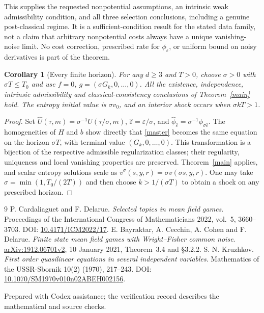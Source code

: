 \documentclass[11pt]{article}
\newtheorem{corollary}{Corollary}
\begin{document}
This supplies the requested nonpotential assumptions, an intrinsic weak admissibility condition, and all three selection conclusions, including a genuine post-classical regime. It is a sufficient-condition result for the stated data family, not a claim that arbitrary nonpotential costs always have a unique vanishing-noise limit. No cost correction, prescribed rate for $\phi_\varepsilon$, or uniform bound on noisy derivatives is part of the theorem.

\begin{corollary}[Every finite horizon]\label{allhorizons}
For any $d\ge3$ and $T>0$, choose $\sigma>0$ with $\sigma T\le T_0$ and use $f=0$, $g=(\sigma G_k,0,\ldots,0)$. All the existence, independence, intrinsic admissibility and classical-consistency conclusions of Theorem~\ref{main} hold. The entropy initial value is $\sigma v_0$, and an interior shock occurs when $\sigma kT>1$.
\end{corollary}
\begin{proof}
Set $\widehat U(\tau,m)=\sigma^{-1}U(\tau/\sigma,m)$, $\widehat\varepsilon=\varepsilon/\sigma$, and
$\widehat\phi_{\widehat\varepsilon}=\sigma^{-1}\phi_{\sigma\widehat\varepsilon}$. The homogeneities of $H$ and $b$ show directly that \eqref{master} becomes the same equation on the horizon $\sigma T$, with terminal value $(G_k,0,\ldots,0)$. This transformation is a bijection of the respective admissible regularization classes; their regularity, uniqueness and local vanishing properties are preserved. Theorem~\ref{main} applies, and scalar entropy solutions scale as $v^\sigma(s,y,r)=\sigma v(\sigma s,y,r)$. One may take $\sigma=\min(1,T_0/(2T))$ and then choose $k>1/(\sigma T)$ to obtain a shock on any prescribed horizon.
\end{proof}

\begin{thebibliography}{9}
\small
{} P. Cardaliaguet and F. Delarue.
\emph{Selected topics in mean field games}.
Proceedings of the International Congress of Mathematicians 2022, vol.~5, 3660--3703.
DOI: \href{https://doi.org/10.4171/ICM2022/17}{10.4171/ICM2022/17}.
 E. Bayraktar, A. Cecchin, A. Cohen and F. Delarue.
\emph{Finite state mean field games with Wright--Fisher common noise}.
\href{https://arxiv.org/pdf/1912.06701v2}{arXiv:1912.06701v2}, 10 January 2021, Theorem~3.4 and \S3.2.2.
 S. N. Kruzhkov.
\emph{First order quasilinear equations in several independent variables}.
Mathematics of the USSR-Sbornik 10(2) (1970), 217--243.
DOI: \href{https://doi.org/10.1070/SM1970v010n02ABEH002156}{10.1070/SM1970v010n02ABEH002156}.
\end{thebibliography}
\smallskip\noindent\footnotesize
Prepared with Codex assistance; the verification record describes the mathematical and source checks.
\normalsize
\end{document}
